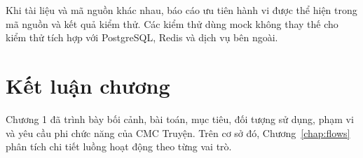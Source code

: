 Khi tài liệu và mã nguồn khác nhau, báo cáo ưu tiên hành vi được thể hiện trong mã nguồn và kết quả kiểm thử. Các kiểm thử dùng mock không thay thế cho kiểm thử tích hợp với PostgreSQL, Redis và dịch vụ bên ngoài.

\section{Kết luận chương}

Chương 1 đã trình bày bối cảnh, bài toán, mục tiêu, đối tượng sử dụng, phạm vi và yêu cầu phi chức năng của CMC Truyện. Trên cơ sở đó, Chương~\ref{chap:flows} phân tích chi tiết luồng hoạt động theo từng vai trò.
